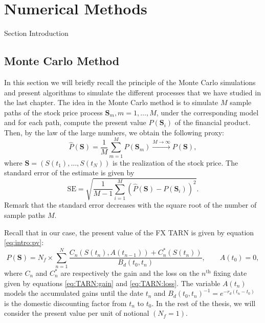 \chapter{Numerical Methods}
\label{sec:methods}


Section Introduction

\section{Monte Carlo Method }
\label{sec:methods:MC}
In this section we will briefly recall the principle of the Monte Carlo simulations and present algorithms to simulate the different processes that we have studied in the last chapter. The idea in the Monte Carlo method is to simulate $M$ sample paths of the stock price process $\mathbf{S}_m, m=1,\ldots,M$, under the corresponding model and for each path, compute the present value $P(\mathbf{S}_i)$ of the financial product. Then, by the law of the large numbers, we obtain the following proxy:
$$\hat{P}(\mathbf{S})=\frac{1}{M}\sum_{m=1}^M P(\mathbf{S}_m)\xrightarrow{M\to\infty} P(\mathbf{S}),$$
where $\mathbf{S}=(S(t_1),\ldots,S(t_N))$ is the realization of the stock price. The standard error of the estimate is given by
$$\text{SE} = \sqrt{\frac{1}{M-1}\sum_{i=1}^M \left(\hat{P}(\mathbf{S})-P(\mathbf{S}_i)\right)^2}.$$
Remark that the standard error decreases with the square root of the number of sample paths $M$.

Recall that in our case, the present value of the FX TARN is given by equation \eqref{eq:intro:pv}:
$$P(\mathbf{S}) =N_f \times \sum_{n=1}^N\frac{C_n(S(t_n),A(t_{n-1}))+C^\ast_n(S(t_n))}{B_d(t_0,t_n)}, \qquad A(t_0)=0,$$
where $C_n$ and $C_n^\ast$ are respectively the gain and the loss on the $n^\text{th}$ fixing date given by equations \eqref{eq:TARN:gain} and \eqref{eq:TARN:loss}. The variable $A(t_n)$ models the accumulated gains until the date $t_n$ and $B_d(t_0,t_n)^{-1}=e^{-r_d(t_n-t_0)}$ is the domestic discounting factor from $t_n$ to $t_0$. In the rest of the thesis, we will consider the present value per unit of notional $(N_f=1)$.

